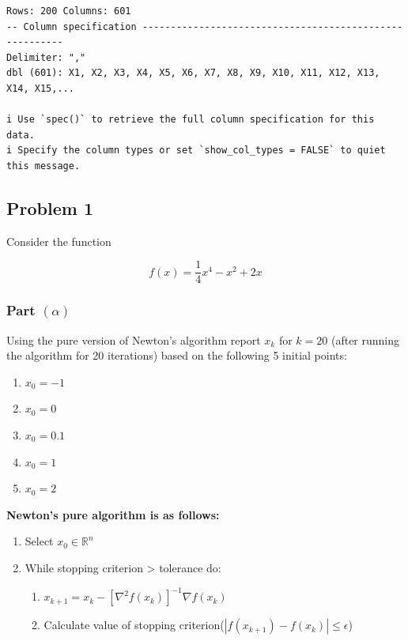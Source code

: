 \documentclass[
  letterpaper,
  DIV=11,
  numbers=noendperiod]{scrartcl}
\providecommand{\tightlist}{%
  \setlength{\itemsep}{0pt}\setlength{\parskip}{0pt}}\usepackage{longtable,booktabs,array}
\begin{document}
\begin{verbatim}
Rows: 200 Columns: 601
-- Column specification --------------------------------------------------------
Delimiter: ","
dbl (601): X1, X2, X3, X4, X5, X6, X7, X8, X9, X10, X11, X12, X13, X14, X15,...

i Use `spec()` to retrieve the full column specification for this data.
i Specify the column types or set `show_col_types = FALSE` to quiet this message.
\end{verbatim}

\newpage

\subsection{Problem 1}\label{problem-1}

Consider the function

\[
f(x) = \frac{1}{4} x^4 - x^2 + 2x
\]

\subsubsection{\texorpdfstring{Part
\((\alpha)\)}{Part (\textbackslash alpha)}}\label{part-alpha}

Using the pure version of Newton's algorithm report \(x_k\) for
\(k = 20\) (after running the algorithm for 20 iterations) based on the
following 5 initial points:

\begin{enumerate}
\def\labelenumi{\arabic{enumi}.}
\tightlist
\item
  \(x_0 = −1\)
\item
  \(x_0 = 0\)
\item
  \(x_0 = 0.1\)
\item
  \(x_0 = 1\)
\item
  \(x_0 = 2\)
\end{enumerate}

\textbf{Newton's pure algorithm is as follows:}

\begin{enumerate}
\def\labelenumi{\arabic{enumi}.}
\tightlist
\item
  Select \(x_0 \in \mathbb{R}^n\)
\item
  While stopping criterion \textgreater{} tolerance do:

  \begin{enumerate}
  \def\labelenumii{\arabic{enumii}.}
  \tightlist
  \item
    \(x_{k+1} = x_k - [\nabla^2f(x_k)]^{-1} \nabla f(x_k)\)
  \item
    Calculate value of stopping
    criterion(\(|f(x_{k+1}) - f(x_k)| \leq \epsilon\))
  \end{enumerate}
\end{enumerate}
\end{document}
